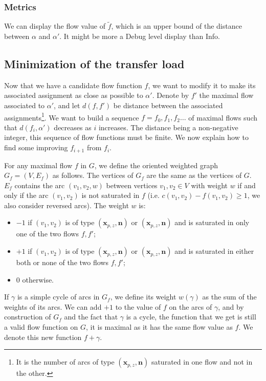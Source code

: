 \documentclass[]{article}
\begin{document}
\subsubsection*{Metrics}

We can display the flow value of $\tilde{f}$, which is an upper bound of the distance between $\alpha$ and $\alpha'$. It might be more a Debug level display than Info.

\subsection{Minimization of the transfer load}

Now that we have a candidate flow function $f$, we want to modify it to make its associated assignment as close as possible to $\alpha'$. Denote by $f'$ the maximal flow associated to $\alpha'$, and let $d(f, f')$ be distance between the associated assignments\footnote{It is the number of arcs of type $(\mathbf{x}_{p,z},\mathbf{n})$ saturated in one flow and not in the other.}. 
We want to build a sequence $f=f_0, f_1, f_2 \dots$ of maximal flows such that $d(f_i, \alpha')$ decreases as $i$ increases. The distance being a non-negative integer, this sequence of flow functions must be finite. We now explain how to find some improving $f_{i+1}$ from $f_i$.

For any maximal flow $f$ in $G$, we define the oriented weighted graph $G_f=(V, E_f)$ as follows. The vertices of $G_f$ are the same as the vertices of $G$. $E_f$ contains the arc $(v_1,v_2, w)$ between vertices $v_1,v_2\in V$ with weight $w$ if and only if the arc $(v_1,v_2)$ is not saturated in $f$ (i.e. $c(v_1,v_2)-f(v_1,v_2) \ge 1$, we also consider reversed arcs). The weight $w$ is: 
\begin{itemize}
	\item  $-1$  if $(v_1,v_2)$ is of type $(\mathbf{x}_{p,z},\mathbf{n})$ or $(\mathbf{x}_{p,z},\mathbf{n})$ and is saturated in only one of the two flows $f,f'$;
	\item $+1$  if $(v_1,v_2)$ is of type $(\mathbf{x}_{p,z},\mathbf{n})$ or $(\mathbf{x}_{p,z},\mathbf{n})$ and is saturated in either both or none of the two flows $f,f'$;
	\item $0$ otherwise.
\end{itemize}

If $\gamma$ is a simple cycle of arcs in $G_f$, we define its weight $w(\gamma)$ as the sum of the weights of its arcs. We can add $+1$ to the value of $f$ on the arcs of $\gamma$, and by construction of $G_f$ and the fact that $\gamma$ is a cycle, the function that we get is still a valid flow function on $G$, it is maximal as it has the same flow value as $f$. We denote this new function $f+\gamma$.
\end{document}
